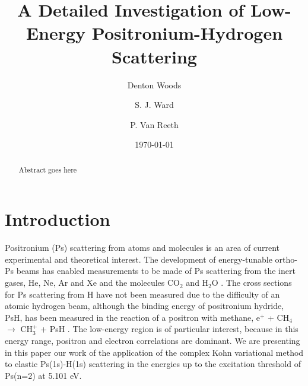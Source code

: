 \documentclass[preprint,showpacs,preprintnumbers,amsmath,amssymb]{revtex4}
\begin{document}

\title{A Detailed Investigation of Low-Energy Positronium-Hydrogen Scattering}

\author{Denton Woods}
\author{S. J. Ward}

\author{P. Van Reeth}

\date{\today}%

\begin{abstract}
Abstract goes here
\end{abstract}
   
\maketitle

\section{\label{sec:Intro}\protect Introduction}



Positronium (Ps) scattering from atoms and molecules is an area of current experimental and theoretical interest. The development of energy-tunable ortho-Ps beams \cite{Garner1996} has enabled measurements
to be made of Ps scattering from the inert gases, He, Ne, Ar and Xe \cite{} and the molecules CO$_2$ and H$_2$O \cite{Brawley2010a,Beale2006}. The cross sections for Ps scattering from H have not been measured due to the difficulty
of an atomic hydrogen beam, although the binding energy of positronium hydride, PsH, has been measured in the reaction of a positron with methane, e$^+$ + CH$_4$ $\to$ CH$_3^+$ + PsH \cite{Schrader1992}.
The low-energy region is of particular interest, because in this energy range, positron and electron correlations are dominant. We are presenting in this paper our work of the application of the complex Kohn variational method to elastic Ps(1s)-H(1s) scattering in the energies up to the excitation threshold of Ps(n=2) at 5.101 eV.
\end{document}
